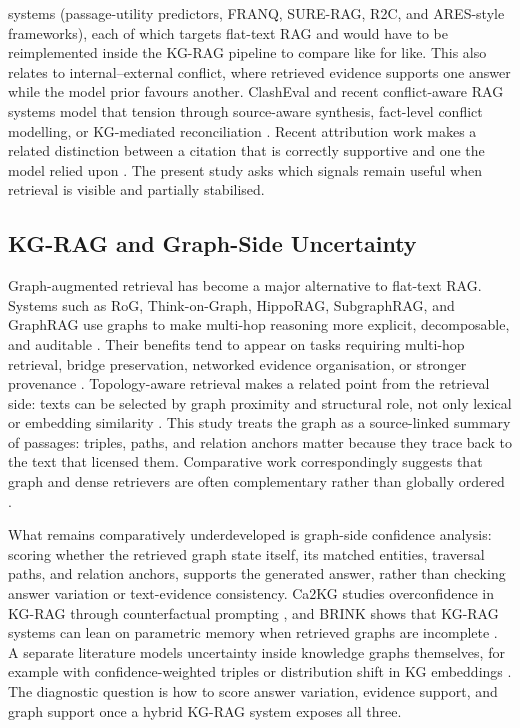systems (passage-utility predictors, FRANQ, SURE-RAG, R2C, and ARES-style
frameworks), each of which targets flat-text RAG and would have to be
reimplemented inside the KG-RAG pipeline to compare like for like.
This also relates to internal--external conflict, where retrieved evidence
supports one answer while the model prior favours another.
ClashEval and recent conflict-aware RAG systems model that tension through
source-aware synthesis, fact-level conflict modelling, or KG-mediated
reconciliation
\citep{wu2024clasheval,wang2025astuterag,zhang2025faithfulrag,liu2025truthfulrag}.
Recent attribution work makes a related distinction between a citation that is
correctly supportive and one the model relied upon
\citep{wallat2025faithfulness}.
The present study asks which signals remain useful when retrieval is
visible and partially stabilised.

\subsection{KG-RAG and Graph-Side Uncertainty}

Graph-augmented retrieval has become a major alternative to flat-text RAG.
Systems such as RoG, Think-on-Graph, HippoRAG, SubgraphRAG, and GraphRAG use
graphs to make multi-hop reasoning more explicit, decomposable, and auditable
\citep{luo2024rog,sun2024tog,ma2025tog2,gutierrez2024hipporag,
li2025subgraphrag,edge2024graphrag}.
Their benefits tend to appear on tasks requiring multi-hop retrieval, bridge
preservation, networked evidence organisation, or stronger provenance
\citep{edge2024graphrag,gutierrez2024hipporag,shen2025gear,
hu2025grag,zhu2025kg2rag,wu2025medgraphrag}.
Topology-aware retrieval makes a related point from the retrieval side: texts
can be selected by graph proximity and structural role, not only lexical or
embedding similarity \citep{wang2024taar}.
This study treats the graph as a source-linked summary of passages: triples,
paths, and relation anchors matter because they trace back to the text that
licensed them.
Comparative work correspondingly suggests that graph and dense retrievers are
often complementary rather than globally ordered
\citep{zhang2025ragvsgraphrag,xiang2025whengraphs,peng2024graphragsurvey,
chen2025comparingraggraphrag}.

What remains comparatively underdeveloped is graph-side confidence
analysis: scoring whether the retrieved graph state itself, its matched
entities, traversal paths, and relation anchors, supports the generated answer,
rather than checking answer variation or text-evidence consistency.
Ca2KG studies overconfidence in KG-RAG through counterfactual prompting
\citep{ren2026ca2kg}, and BRINK shows that KG-RAG systems can lean on
parametric memory when retrieved graphs are incomplete \citep{zhou2025brink}.
A separate literature models uncertainty inside knowledge graphs themselves,
for example with confidence-weighted triples or distribution shift in KG
embeddings \citep{takahashi2025uncertaintyawarekg,
lee2025decomposinguncertaintykge,zhu2025certainty}.
The diagnostic question is how to score answer variation, evidence support, and
graph support once a hybrid KG-RAG system exposes all three.
